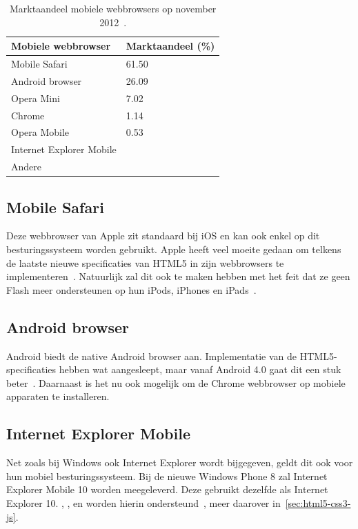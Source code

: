 \begin{table}
\begin{center}
\begin{tabular}{ll}
\hline
\textbf{Mobiele webbrowser} & \textbf{Marktaandeel} (\%) \\
\hline
\hline
Mobile Safari				& 61.50 \\
Android browser				& 26.09 \\
Opera Mini				& 7.02 	\\
Chrome					& 1.14 	\\
Opera Mobile				& 0.53 	\\
Internet Explorer Mobile & 		\\
Andere					& 		\\
\hline
\end{tabular}
\caption{Marktaandeel mobiele webbrowsers op november 2012~\cite{NetApplications2012}.}
\label{tbl:marktaandeel-browsers}
\end{center}
\end{table}

\subsection{Mobile Safari}
\label{sec:mobile-safari}
Deze webbrowser van Apple zit standaard bij iOS en kan ook enkel op dit besturingssysteem worden gebruikt. 
Apple heeft veel moeite gedaan om telkens de laatste nieuwe specificaties van HTML5 in zijn webbrowsers te implementeren~\cite{Hales2012}. 
Natuurlijk zal dit ook te maken hebben met het feit dat ze geen Flash meer ondersteunen op hun iPods, iPhones en iPads~\cite{Jobs2010}.

\subsection{Android browser}
\label{sec:android-browser}
Android biedt de native Android browser aan. 
Implementatie van de HTML5-specificaties hebben wat aangesleept, maar vanaf Android 4.0 gaat dit een stuk beter~\cite{Hales2012}. 
Daarnaast is het nu ook mogelijk om de Chrome webbrowser op mobiele apparaten te installeren.

\subsection{Internet Explorer Mobile}
Net zoals bij Windows ook Internet Explorer wordt bijgegeven, geldt dit ook voor hun mobiel  besturingssysteem. 
Bij de nieuwe Windows Phone 8 zal Internet Explorer Mobile 10 worden meegeleverd. 
Deze gebruikt dezelfde  als Internet Explorer 10. , ,  en  worden hierin ondersteund~\cite{Hales2012}, meer daarover in~\ref{sec:html5-css3-js}.

